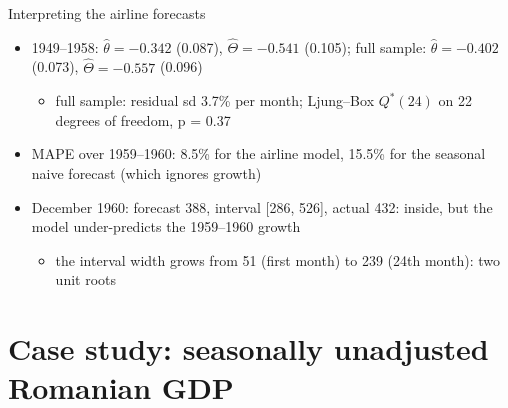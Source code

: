\begin{frame}{Interpreting the airline forecasts}
\itemsize{\footnotesize}
\begin{itemize}
    \item 1949--1958: $\hat\theta = \ensuremath{-}0.342$ (0.087), $\hat\Theta = \ensuremath{-}0.541$ (0.105); full sample: $\hat\theta = \ensuremath{-}0.402$ (0.073), $\hat\Theta = \ensuremath{-}0.557$ (0.096)
    \begin{itemize}
        \item full sample: residual sd 3.7\% per month; Ljung--Box $Q^*(24)$ on 22 degrees of freedom, p = 0.37
    \end{itemize}
    \item MAPE over 1959--1960: 8.5\% for the airline model, 15.5\% for the seasonal naive forecast (which ignores growth)
    \item December 1960: forecast 388, interval [286, 526], actual 432: inside, but the model under-predicts the 1959--1960 growth
    \begin{itemize}
        \item the interval width grows from 51 (first month) to 239 (24th month): two unit roots
    \end{itemize}
\end{itemize}
\end{frame}


\section{Case study: seasonally unadjusted Romanian GDP}

